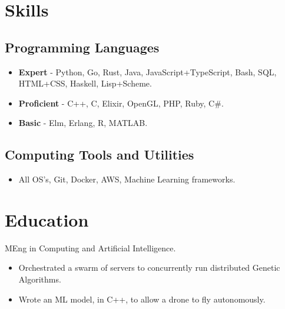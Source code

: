 \documentclass{jcgcv}
\begin{document}
\begin{column}



\section{Skills}

\subsection{Programming Languages}
\begin{itemize}
  \item \textbf{Expert} - Python, Go, Rust, Java, JavaScript+TypeScript, Bash,
        SQL, HTML+CSS, Haskell, Lisp+Scheme.
  \item \textbf{Proficient} - C++, C, Elixir, OpenGL, PHP, Ruby, C\#.
  \item \textbf{Basic} - Elm, Erlang, R, MATLAB.
\end{itemize}

\subsection{Computing Tools and Utilities}
\begin{itemize}
  \item All OS's, Git, Docker, AWS, Machine Learning frameworks.
\end{itemize}



\section{Education}
MEng in Computing and Artificial Intelligence.

\vspace{2pt}

\begin{adjustwidth}{0.3cm}{}

\begin{itemize}
  \item Orchestrated a swarm of servers to concurrently run distributed
        Genetic Algorithms.
\end{itemize}

\begin{itemize}
  \item Wrote an ML model, in C++, to allow a drone to fly autonomously.
\end{itemize}


\end{adjustwidth}
\end{column}
\end{document}
